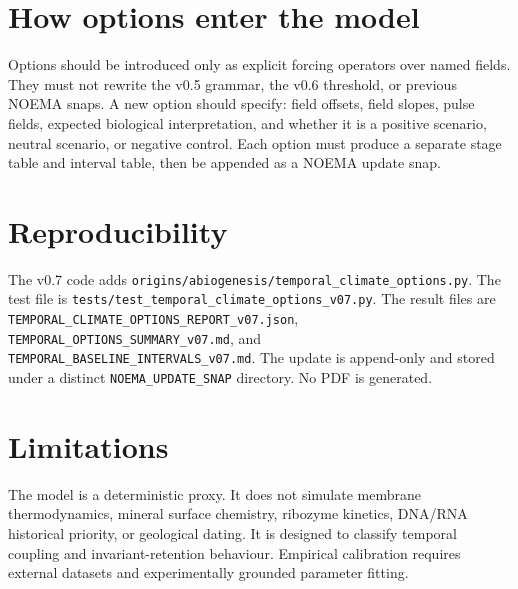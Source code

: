 \documentclass[11pt]{article}
\begin{document}
\section{How options enter the model}
Options should be introduced only as explicit forcing operators over named fields. They must not rewrite the v0.5 grammar, the v0.6 threshold, or previous NOEMA snaps.  A new option should specify: field offsets, field slopes, pulse fields, expected biological interpretation, and whether it is a positive scenario, neutral scenario, or negative control.  Each option must produce a separate stage table and interval table, then be appended as a NOEMA update snap.

\section{Reproducibility}
The v0.7 code adds \texttt{origins/abiogenesis/temporal\_climate\_options.py}.  The test file is \texttt{tests/test\_temporal\_climate\_options\_v07.py}.  The result files are \texttt{TEMPORAL\_CLIMATE\_OPTIONS\_REPORT\_v07.json}, \texttt{TEMPORAL\_OPTIONS\_SUMMARY\_v07.md}, and \texttt{TEMPORAL\_BASELINE\_INTERVALS\_v07.md}.  The update is append-only and stored under a distinct \texttt{NOEMA\_UPDATE\_SNAP} directory. No PDF is generated.

\section{Limitations}
The model is a deterministic proxy.  It does not simulate membrane thermodynamics, mineral surface chemistry, ribozyme kinetics, DNA/RNA historical priority, or geological dating.  It is designed to classify temporal coupling and invariant-retention behaviour. Empirical calibration requires external datasets and experimentally grounded parameter fitting.



\end{document}
